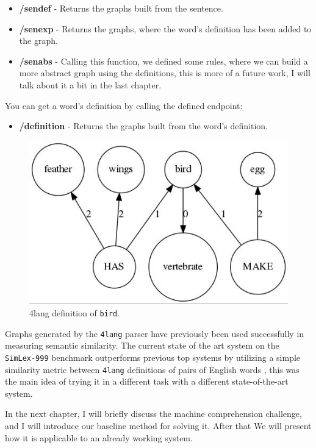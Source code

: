 \begin{itemize}
	\item \textbf{/sendef} - Returns the graphs built from the sentence.
	\item \textbf{/senexp} - Returns the graphs, where the word's definition has been added to the graph.
	\item \textbf{/senabs} - Calling this function, we defined some rules, where we can build a more abstract graph using the definitions, this is more of a future work, I will talk about it  a bit in the last chapter.
\end{itemize}
You can get a word's definition by calling the defined endpoint:
\begin{itemize}
	\item \textbf{/definition} - Returns the graphs built from the word's definition.
\end{itemize}


\begin{figure}[!htb]
	\centering
	\includegraphics[scale=0.5]{figures/bird}
	\caption{4lang definition of \texttt{bird}.}
	\label{fig:bird}
\end{figure}

Graphs generated by the \texttt{4lang} parser have previously been used
successfully in measuring semantic similarity. The current state of the
art system on the \texttt{SimLex-999} benchmark \cite{Hill:2014a}
outperforms previous top systems by utilizing a simple similarity metric
between \texttt{4lang} definitions of pairs of English words
\cite{Recski:2016c}, this was the main idea of trying it in a different task with a different state-of-the-art system.

In the next chapter, I will briefly discuss the machine comprehension challenge, and I will introduce our baseline method for solving it. After that We will present how it is applicable to an already working system.